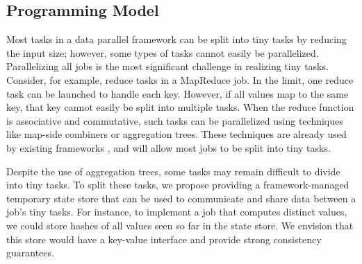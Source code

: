 \subsection{Programming Model}
\label{sec:prog}
Most tasks in a data parallel framework can be split into tiny tasks by
reducing the input size; however, some types of tasks cannot easily be
parallelized. Parallelizing all jobs is the most significant challenge
in realizing tiny tasks.
Consider, for example, reduce tasks in a MapReduce job. In the limit,
one reduce task can be launched to handle each key. However, if all
values map to the same key, that key cannot easily be split into multiple
tasks.
When the reduce function is associative and commutative, such tasks can be parallelized using techniques like map-side combiners or aggregation trees.
These techniques are already used by existing frameworks \cite{yu2008dryadlinq}, and will allow most jobs to be split into tiny tasks.



Despite the use of aggregation trees, some tasks may remain
difficult to divide into tiny tasks.
To split these tasks, we propose providing a framework-managed
temporary state store that can be used to communicate and share data between a
job's tiny tasks.
For instance, to implement a job that computes distinct values, we could store hashes of all values seen so far in the state store.
We envision that this store would have a key-value interface and provide strong consistency guarantees.

